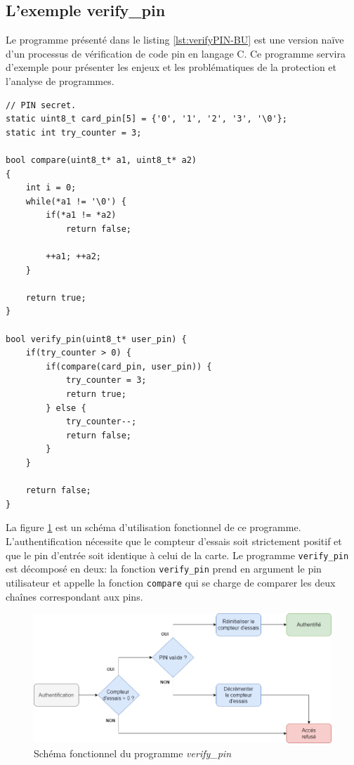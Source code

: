         \subsection*{L'exemple verify\_pin}
            
            Le programme présenté dans le listing \ref{lst:verifyPIN-BU} est une version naïve d'un processus de vérification de code \gls{pin} en langage C. Ce programme servira d'exemple pour présenter les enjeux et les problématiques de la protection et l'analyse de programmes. 
            
\begin{lstlisting}
// PIN secret.
static uint8_t card_pin[5] = {'0', '1', '2', '3', '\0'}; 
static int try_counter = 3;

bool compare(uint8_t* a1, uint8_t* a2)
{
    int i = 0;
    while(*a1 != '\0') {
        if(*a1 != *a2)
            return false;

        ++a1; ++a2;
    }

    return true;
}

bool verify_pin(uint8_t* user_pin) { 
    if(try_counter > 0) {    
        if(compare(card_pin, user_pin)) {
            try_counter = 3;
            return true;
        } else {
            try_counter--;
            return false;
        }
    }

    return false;
}
\end{lstlisting}

        La figure \ref{fig:verifyPIN-spec} est un schéma d'utilisation fonctionnel de ce programme. L'authentification nécessite que le compteur d'essais soit strictement positif et que le \gls{pin} d'entrée soit identique à celui de la carte.
        Le programme \texttt{verify\_pin} est décomposé en deux: la fonction \texttt{verify\_pin} prend en argument le \gls{pin} utilisateur et appelle la fonction \texttt{compare} qui se charge de comparer les deux chaînes correspondant aux \gls{pin}s.        
        
        \begin{figure}[!ht]\centering
            \includegraphics[scale=0.4]{ch1-context/img/verifyPINSpec.png}
            \caption{Schéma fonctionnel du programme \textit{verify\_pin}}  \label{fig:verifyPIN-spec}
        \end{figure}
        
